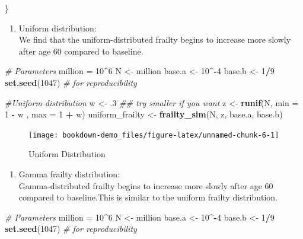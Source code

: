 \documentclass[]{book}
\newenvironment{Shaded}{\begin{snugshade}}{\end{snugshade}}
\newcommand{\CommentTok}[1]{\textcolor[rgb]{0.56,0.35,0.01}{\textit{#1}}}
\newcommand{\DataTypeTok}[1]{\textcolor[rgb]{0.13,0.29,0.53}{#1}}
\newcommand{\DecValTok}[1]{\textcolor[rgb]{0.00,0.00,0.81}{#1}}
\newcommand{\FloatTok}[1]{\textcolor[rgb]{0.00,0.00,0.81}{#1}}
\newcommand{\KeywordTok}[1]{\textcolor[rgb]{0.13,0.29,0.53}{\textbf{#1}}}
\newcommand{\NormalTok}[1]{#1}
\newcommand{\OperatorTok}[1]{\textcolor[rgb]{0.81,0.36,0.00}{\textbf{#1}}}
\newcommand{\StringTok}[1]{\textcolor[rgb]{0.31,0.60,0.02}{#1}}
\providecommand{\tightlist}{%
  \setlength{\itemsep}{0pt}\setlength{\parskip}{0pt}}
\begin{document}
\begin{enumerate}
\begin{Shaded}
\begin{Highlighting}[]
\NormalTok{  \}}
\end{Highlighting}
\end{Shaded}

  \begin{enumerate}
  \def\labelenumii{\alph{enumii}.}
  \tightlist
  \item
    Uniform distribution:\\
    We find that the uniform-distributed frailty begins to increase more slowly after age 60 compared to baseline.
  \end{enumerate}

\begin{Shaded}
\begin{Highlighting}[]
\CommentTok{# Parameters}
\NormalTok{million =}\StringTok{ }\DecValTok{10}\OperatorTok{^}\DecValTok{6}
\NormalTok{N <-}\StringTok{  }\NormalTok{million}
\NormalTok{base.a <-}\StringTok{ }\DecValTok{10}\OperatorTok{^-}\DecValTok{4}
\NormalTok{base.b <-}\StringTok{ }\DecValTok{1}\OperatorTok{/}\DecValTok{9}
\KeywordTok{set.seed}\NormalTok{(}\DecValTok{1047}\NormalTok{) }\CommentTok{# for reproducibility}

\CommentTok{#Uniform distribution}
\NormalTok{w <-}\StringTok{ }\FloatTok{.3} \CommentTok{## try smaller if you want}
\NormalTok{z <-}\StringTok{ }\KeywordTok{runif}\NormalTok{(N, }\DataTypeTok{min =} \DecValTok{1} \OperatorTok{-}\StringTok{ }\NormalTok{w , }\DataTypeTok{max =} \DecValTok{1} \OperatorTok{+}\StringTok{ }\NormalTok{w)}
\NormalTok{uniform_frailty <-}\StringTok{ }\KeywordTok{frailty_sim}\NormalTok{(N, z, base.a, base.b)}
\end{Highlighting}
\end{Shaded}

  \begin{figure}
   \texttt{[image: bookdown-demo\_files/figure-latex/unnamed-chunk-6-1]} \caption{Uniform Distribution}\label{fig:unnamed-chunk-6}
   \end{figure}

  \begin{enumerate}
  \def\labelenumii{\alph{enumii}.}
  \setcounter{enumii}{1}
  \tightlist
  \item
    Gamma frailty distribution:\\
    Gamma-distributed frailty begins to increase more slowly after age 60 compared to baseline.This is similar to the uniform frailty distribution.
  \end{enumerate}

\begin{Shaded}
\begin{Highlighting}[]
\CommentTok{# Parameters}
\NormalTok{million =}\StringTok{ }\DecValTok{10}\OperatorTok{^}\DecValTok{6}
\NormalTok{N <-}\StringTok{  }\NormalTok{million}
\NormalTok{base.a <-}\StringTok{ }\DecValTok{10}\OperatorTok{^-}\DecValTok{4}
\NormalTok{base.b <-}\StringTok{ }\DecValTok{1}\OperatorTok{/}\DecValTok{9}
\KeywordTok{set.seed}\NormalTok{(}\DecValTok{1047}\NormalTok{) }\CommentTok{# for reproducibility}


\end{Highlighting}
\end{Shaded}
\end{enumerate}
\end{document}
